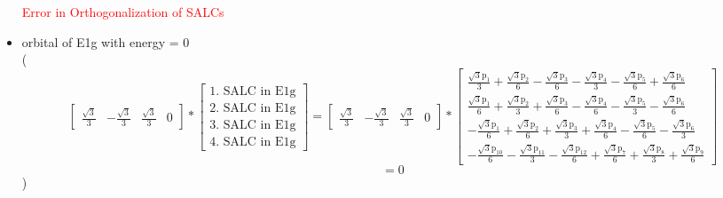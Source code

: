 \documentclass[12pt,a4paper]{article}
\begin{document}
\begin{itemize}
\textcolor{red}{Error in Orthogonalization of SALCs}\item orbital of E1g with energy = 
                                $0$ \\
( 
$$
\left[\begin{matrix}\frac{\sqrt{3}}{3} & - \frac{\sqrt{3}}{3} & \frac{\sqrt{3}}{3} & 0\end{matrix}\right] * \left[\begin{array}{c}\text{1. SALC in E1g} \\ \text{2. SALC in E1g} \\ \text{3. SALC in E1g} \\ \text{4. SALC in E1g}\end{array}\right] = \left[\begin{matrix}\frac{\sqrt{3}}{3} & - \frac{\sqrt{3}}{3} & \frac{\sqrt{3}}{3} & 0\end{matrix}\right] * \left[\begin{matrix}\frac{\sqrt{3} \text{p}_{1}}{3} + \frac{\sqrt{3} \text{p}_{2}}{6} - \frac{\sqrt{3} \text{p}_{3}}{6} - \frac{\sqrt{3} \text{p}_{4}}{3} - \frac{\sqrt{3} \text{p}_{5}}{6} + \frac{\sqrt{3} \text{p}_{6}}{6}\\\frac{\sqrt{3} \text{p}_{1}}{6} + \frac{\sqrt{3} \text{p}_{2}}{3} + \frac{\sqrt{3} \text{p}_{3}}{6} - \frac{\sqrt{3} \text{p}_{4}}{6} - \frac{\sqrt{3} \text{p}_{5}}{3} - \frac{\sqrt{3} \text{p}_{6}}{6}\\- \frac{\sqrt{3} \text{p}_{1}}{6} + \frac{\sqrt{3} \text{p}_{2}}{6} + \frac{\sqrt{3} \text{p}_{3}}{3} + \frac{\sqrt{3} \text{p}_{4}}{6} - \frac{\sqrt{3} \text{p}_{5}}{6} - \frac{\sqrt{3} \text{p}_{6}}{3}\\- \frac{\sqrt{3} \text{p}_{10}}{6} - \frac{\sqrt{3} \text{p}_{11}}{3} - \frac{\sqrt{3} \text{p}_{12}}{6} + \frac{\sqrt{3} \text{p}_{7}}{6} + \frac{\sqrt{3} \text{p}_{8}}{3} + \frac{\sqrt{3} \text{p}_{9}}{6}\end{matrix}\right] 
 $$ $$ = 0 
 $$ 
 )


\end{itemize}
\end{document}

